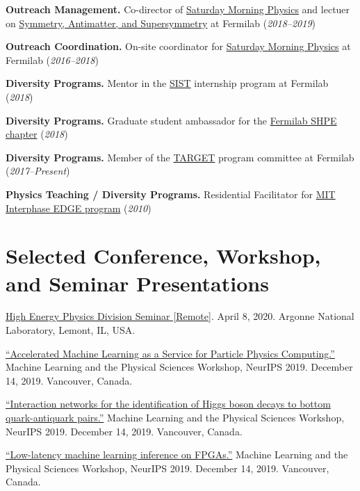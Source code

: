 \documentclass[11pt]{res}
\newcommand{\MarginText}[1]{\section{#1}\vspace{10pt}}
\begin{document}
\begin{resume}
\textbf{Outreach Management.} Co-director of \href{http://saturdaymorningphysics.fnal.gov/}{Saturday
  Morning Physics} and lectuer on \href{http://saturdaymorningphysics.fnal.gov/fall-session-2018/}{Symmetry, Antimatter, and Supersymmetry} at Fermilab (\textit{2018--2019})

\textbf{Outreach Coordination.} On-site coordinator for \href{http://saturdaymorningphysics.fnal.gov/}{Saturday Morning Physics} at Fermilab (\textit{2016--2018})

\textbf{Diversity Programs.} Mentor in the \href{http://diversity.fnal.gov/sist/}{SIST} internship program at Fermilab (\textit{2018})

\textbf{Diversity Programs.} Graduate student ambassador for the \href{http://diversity.fnal.gov/fshpe/}{Fermilab SHPE chapter} (\textit{2018})

\textbf{Diversity Programs.} Member of the \href{http://diversity.fnal.gov/target/}{TARGET} program committee at Fermilab (\textit{2017--Present})

\textbf{Physics Teaching / Diversity Programs.} Residential Facilitator for \href{http://ome.mit.edu/programs-services/program-overview}{MIT
  Interphase EDGE program} (\textit{2010})


\MarginText{Selected Conference, Workshop, and Seminar Presentations}

\href{https://indico.fnal.gov/event/22961/}{High Energy Physics Division Seminar [Remote]}. April 8, 2020. Argonne National Laboratory, Lemont, IL, USA.

\href{https://ml4physicalsciences.github.io/files/NeurIPS_ML4PS_2019_64.pdf}{``Accelerated Machine Learning as a Service for
Particle Physics Computing.''} Machine Learning and the Physical Sciences Workshop, NeurIPS 2019. December 14, 2019. Vancouver, Canada.

\href{https://ml4physicalsciences.github.io/files/NeurIPS_ML4PS_2019_71.pdf}{``Interaction networks for the identification of Higgs boson decays to bottom quark-antiquark pairs.''} Machine Learning and the Physical Sciences Workshop, NeurIPS 2019.  December 14, 2019. Vancouver, Canada.

\href{https://ml4physicalsciences.github.io/files/NeurIPS_ML4PS_2019_74.pdf}{``Low-latency machine learning inference on FPGAs.''} Machine Learning and the Physical Sciences Workshop, NeurIPS 2019.  December 14, 2019. Vancouver, Canada.


\end{resume}
\end{document}
